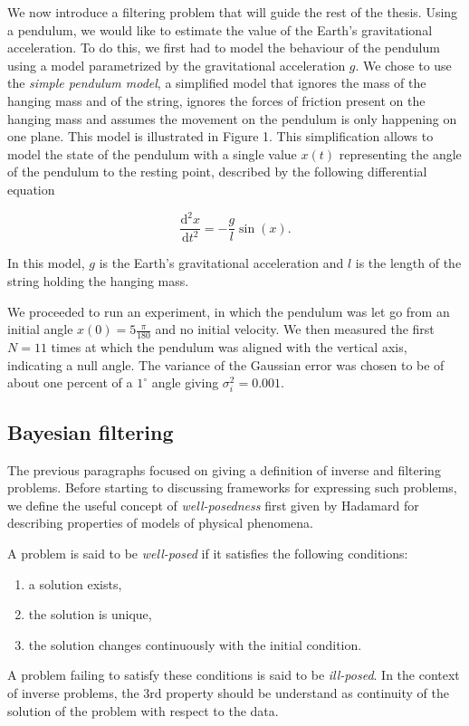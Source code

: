 We now introduce a filtering problem that will guide the rest of the thesis. Using a pendulum, we would like to estimate the value of the Earth's gravitational acceleration. To do this, we first had to model the behaviour of the pendulum using a model parametrized by the gravitational acceleration $g$. We chose to use the \textit{simple pendulum model}, a simplified model that ignores the mass of the hanging mass and of the string, ignores the forces of friction present on the hanging mass and assumes the movement on the pendulum is only happening on one plane. This model is illustrated in Figure 1. This simplification allows to model the state of the pendulum with a single value $x(t)$ representing the angle of the pendulum to the resting point, described by the following differential equation

\begin{equation}
  \frac{\text{d}^2x}{\text{d}t^2} = -\frac{g}{l}\sin(x).
\end{equation}

In this model, $g$ is the Earth's gravitational acceleration and $l$ is the length of the string holding the hanging mass.

We proceeded to run an experiment, in which the pendulum was let go from an initial angle $x(0) = 5\frac{\pi}{180}$ and no initial velocity. We then measured the first $N = 11$ times at which the pendulum was aligned with the vertical axis, indicating a null angle. The variance of the Gaussian error was chosen to be of about one percent of a $1^\circ$ angle giving $\sigma_i^2 = 0.001$.

\subsection{Bayesian filtering}

The previous paragraphs focused on giving a definition of inverse and filtering problems. Before starting to discussing frameworks for expressing such problems, we define the useful concept of \textit{well-posedness} first given by Hadamard for describing properties of models of physical phenomena.

\begin{definition} A problem is said to be \textit{well-posed} if it satisfies the following conditions:
  \begin{enumerate}
  \item{a solution exists,}
  \item{the solution is unique,}
  \item{the solution changes continuously with the initial condition.}
  \end{enumerate}

  A problem failing to satisfy these conditions is said to be \textit{ill-posed}. In the context of inverse problems, the 3rd property should be understand as continuity of the solution of the problem with respect to the data.  
\end{definition}

